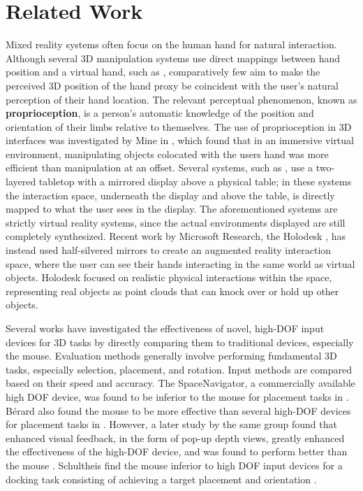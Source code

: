 \section{Related Work}\label{sec:related}
Mixed reality systems often focus on the human hand for natural interaction.
Although several 3D manipulation systems use direct mappings between hand
position and a virtual hand, such as \cite{poupyrev1996go},
comparatively few aim to make the perceived 3D position of the hand proxy be
coincident with the user's natural perception of their
hand location. The relevant perceptual phenomenon, known as {\bf
proprioception}, is a person's automatic knowledge of the position and
orientation of their
limbs relative to themselves. The use of proprioception in 3D interfaces was
investigated by Mine in \cite{mine1997exploiting}, which found that
in an immersive virtual environment, manipulating objects colocated with the
users hand was more efficient than manipulation at an offset. Several systems,
such as \cite{mulder2002personal, prachyabrued2011dropping}, use a two-layered
tabletop with a mirrored display above a physical table; in these systems the
interaction space, underneath
the display and above the table, is directly mapped to what the user sees in the
display. The aforementioned systems are strictly virtual reality systems, since
the actual environments displayed
are still completely synthesized. Recent work by Microsoft Research, the
Holodesk \cite{holodesk}, has instead used half-silvered mirrors to create an
augmented reality
interaction space, where the user can see their hands interacting in the same
world as virtual objects. Holodesk focused on realistic physical interactions
within the space,
representing real objects as point clouds that can knock over or hold up other
objects.

Several works have investigated the effectiveness of novel, high-DOF input
devices for 3D tasks by directly comparing them to traditional devices,
especially the mouse.
Evaluation methods generally involve performing fundamental 3D tasks, especially
selection, placement, and rotation. Input methods are compared based on their
speed and accuracy. The SpaceNavigator, a commercially available high DOF
device, was found to be inferior to the mouse for placement tasks in
\cite{mattheiss2011navigating}. B{\'e}rard \etal also found the mouse to be more
effective than several high-DOF devices for placement tasks
in \cite{study1}.  However, a later study by the same group found that enhanced
visual feedback, in the form of pop-up depth views, greatly enhanced the
effectiveness
of the high-DOF device, and was found to perform better than the mouse
\cite{study2}. Schultheis \etal find the mouse inferior to high DOF input devices
for a docking task consisting of achieving a target placement and orientation
\cite{schultheis2012comparison}.

